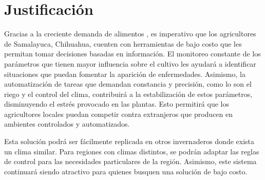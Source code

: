 \section{Justificación}


Gracias a la creciente demanda de alimentos \cite{wik_pingali_brocai_2008}, es imperativo que los agricultores de Samalayuca, Chihuahua, cuenten con herramientas de bajo costo que les permitan tomar decisiones basadas en información. El monitoreo constante de los parámetros que tienen mayor influencia sobre el cultivo les ayudará a identificar situaciones que puedan fomentar la aparición de enfermedades. Asimismo, la automatización de tareas que demandan constancia y precisión, como lo son el riego y el control del clima, contribuirá a la estabilización de estos parámetros, disminuyendo el estrés provocado en las plantas. Esto permitirá que los agricultores locales puedan competir contra extranjeros que producen en ambientes controlados y automatizados. 

Esta solución podrá ser fácilmente replicada en otros invernaderos donde exista un clima similar. Para regiones con climas distintos, se podrán adaptar las reglas de control para las necesidades particulares de la región. Asimismo, este sistema continuará siendo atractivo para quienes busquen una solución de bajo costo.
